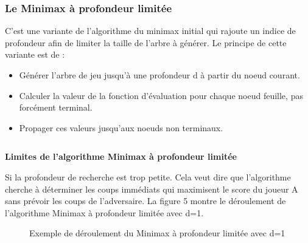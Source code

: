 \documentclass[11pt]{article}
\newcommand{\tmstrong}[1]{\textbf{#1}}
\newcommand{\tmtextit}[1]{{\itshape{#1}}}
\newenvironment{itemizedot}{\begin{itemize} \renewcommand{\labelitemi}{$\bullet$}\renewcommand{\labelitemii}{$\bullet$}\renewcommand{\labelitemiii}{$\bullet$}\renewcommand{\labelitemiv}{$\bullet$}}{\end{itemize}}
\begin{document}
\subsubsection{Le Minimax à profondeur limitée}

C'est une variante de l'algorithme du minimax initial qui rajoute un indice de
profondeur afin de limiter la taille de l'arbre à générer. Le
principe de cette variante est de :

\tmtextit{\begin{itemizedot}
  \item Générer l'arbre de jeu jusqu'à une profondeur d à
  partir du noeud courant.
  
  \item Calculer la valeur de la fonction d'évaluation pour chaque noeud
  feuille, pas forcément terminal.
  
  \item Propager ces valeurs jusqu'aux noeuds non terminaux.
\end{itemizedot}}

{\noindent}{\noindent}\begin{tabular}{l}

\end{tabular}{\hspace*{\fill}}{\smallskip}

{\tmstrong{Limites de l'algorithme Minimax à profondeur limitée}}

Si la profondeur de recherche est trop petite. Cela veut dire que l'algorithme cherche à déterminer les coups immédiats qui maximisent le score
du joueur A sans prévoir les coups de l'adversaire. La figure 5 montre le
déroulement de l'algorithme Minimax à profondeur limitée avec d=1.

\begin{figure}[h]
  \caption {Exemple de déroulement du Minimax à profondeur limitée avec d=1}
\end{figure}
\end{document}
